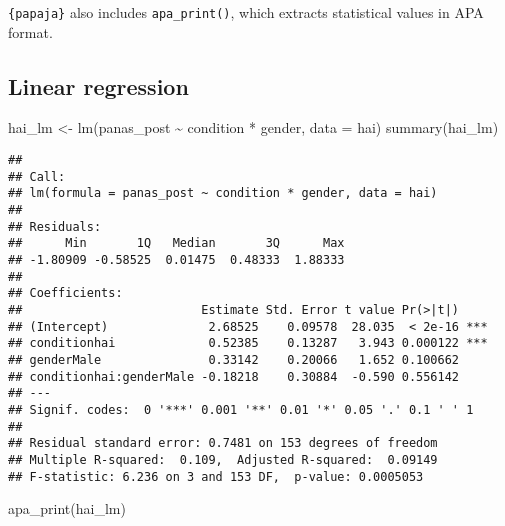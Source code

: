 \documentclass[
  doc]{apa6}
\newenvironment{Shaded}{\begin{snugshade}}{\end{snugshade}}
\newcommand{\AttributeTok}[1]{\textcolor[rgb]{0.77,0.63,0.00}{#1}}
\newcommand{\FunctionTok}[1]{\textcolor[rgb]{0.00,0.00,0.00}{#1}}
\newcommand{\NormalTok}[1]{#1}
\newcommand{\OtherTok}[1]{\textcolor[rgb]{0.56,0.35,0.01}{#1}}
\newcommand{\SpecialCharTok}[1]{\textcolor[rgb]{0.00,0.00,0.00}{#1}}
\begin{document}
\texttt{\{papaja\}} also includes \texttt{apa\_print()}, which extracts statistical values in APA format.

\hypertarget{linear-regression}{%
\subsection{Linear regression}\label{linear-regression}}

\begin{Shaded}
\begin{Highlighting}[]
\NormalTok{hai\_lm }\OtherTok{\textless{}{-}} \FunctionTok{lm}\NormalTok{(panas\_post }\SpecialCharTok{\textasciitilde{}}\NormalTok{ condition }\SpecialCharTok{*}\NormalTok{ gender, }\AttributeTok{data =}\NormalTok{ hai)}
\FunctionTok{summary}\NormalTok{(hai\_lm)}
\end{Highlighting}
\end{Shaded}

\begin{verbatim}
## 
## Call:
## lm(formula = panas_post ~ condition * gender, data = hai)
## 
## Residuals:
##      Min       1Q   Median       3Q      Max 
## -1.80909 -0.58525  0.01475  0.48333  1.88333 
## 
## Coefficients:
##                         Estimate Std. Error t value Pr(>|t|)    
## (Intercept)              2.68525    0.09578  28.035  < 2e-16 ***
## conditionhai             0.52385    0.13287   3.943 0.000122 ***
## genderMale               0.33142    0.20066   1.652 0.100662    
## conditionhai:genderMale -0.18218    0.30884  -0.590 0.556142    
## ---
## Signif. codes:  0 '***' 0.001 '**' 0.01 '*' 0.05 '.' 0.1 ' ' 1
## 
## Residual standard error: 0.7481 on 153 degrees of freedom
## Multiple R-squared:  0.109,  Adjusted R-squared:  0.09149 
## F-statistic: 6.236 on 3 and 153 DF,  p-value: 0.0005053
\end{verbatim}

\begin{Shaded}
\begin{Highlighting}[]
\FunctionTok{apa\_print}\NormalTok{(hai\_lm)}
\end{Highlighting}
\end{Shaded}
\end{document}
